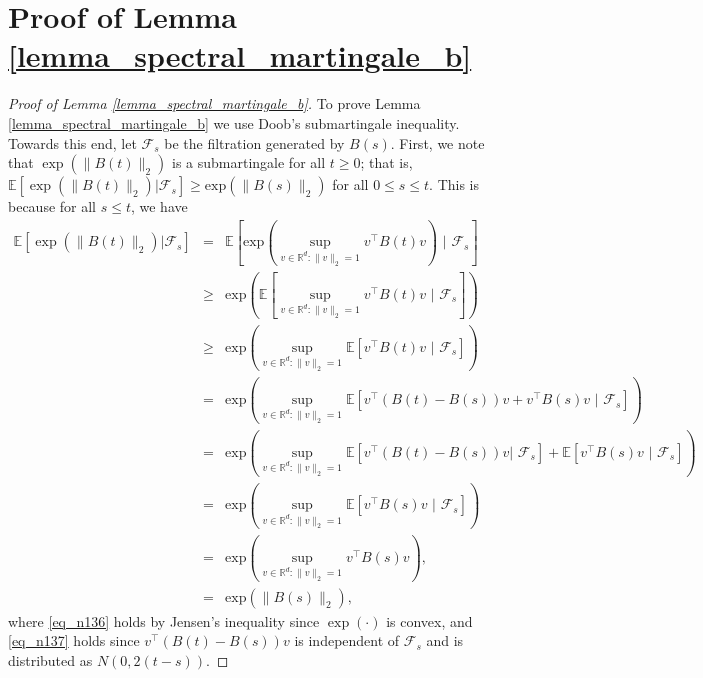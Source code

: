 \documentclass[11pt,letterpaper]{article}
\begin{document}
\section{Proof of Lemma \ref{lemma_spectral_martingale_b}}\label{sec_proof_of_lemma_spectral_martingale_b}
%
\begin{proof}[Proof of Lemma \ref{lemma_spectral_martingale_b}]
%
To prove Lemma \ref{lemma_spectral_martingale_b} we use Doob's submartingale inequality.
%
Towards this end, let  $\mathcal{F}_s$ be the filtration generated by $B(s)$.
%
First, we note that $\exp(\|B(t)\|_2)$ is a submartingale for all $t \geq 0$; that is, $\mathbb{E}[\exp(\|B(t)\|_2) |  \mathcal{F}_s] \geq  \mathrm{exp}(\| B(s)\|_2 )$ for all $0\leq s \leq t$.
%
This is because for all $s \leq t$, we have
\begin{eqnarray}
\mathbb{E}[\exp(\|B(t)\|_2) |  \mathcal{F}_s] &=& \mathbb{E}\left[\mathrm{exp}\left(\sup_{v \in \mathbb{R}^d: \|v\|_2 = 1} v^\top B(t) v\right) \, \, \bigg | \, \,\mathcal{F}_s\right] \nonumber\\
%
&\geq & \mathrm{exp}\left(\mathbb{E}\left[\sup_{v \in \mathbb{R}^d: \|v\|_2 = 1} v^\top B(t) v \, \, \bigg | \, \,\mathcal{F}_s\right]\right) \label{eq_n136}\\
%
%
&\geq &\mathrm{exp}\left(\sup_{v \in \mathbb{R}^d: \|v\|_2 = 1}  \mathbb{E}\left[v^\top B(t) v \, \,  | \, \, \mathcal{F}_s\right]\right) \nonumber \\
%
&=&  \mathrm{exp}\left(\sup_{v \in \mathbb{R}^d: \|v\|_2 = 1}  \mathbb{E}\left[v^\top (B(t) - B(s)) v  + v^\top B(s) v \, \,  | \, \, \mathcal{F}_s\right] \right)  \nonumber \\
%
&=&  \mathrm{exp}\left(\sup_{v \in \mathbb{R}^d: \|v\|_2 = 1}  \mathbb{E}\left[v^\top (B(t) - B(s)) v | \, \, \mathcal{F}_s\right]  +  \mathbb{E}\left[v^\top B(s) v \, \,  | \, \, \mathcal{F}_s\right] \right)  \label{eq_n137} \\
%
&=& \mathrm{exp}\left( \sup_{v \in \mathbb{R}^d: \|v\|_2 = 1}  \mathbb{E}\left[v^\top B(s) v \, \,  | \, \, \mathcal{F}_s\right] \right)  \nonumber \\
%
&=& \mathrm{exp}\left(\sup_{v \in \mathbb{R}^d: \|v\|_2 = 1}  v^\top B(s) v \right),  \nonumber \\
%
&=& \mathrm{exp}(\| B(s)\|_2 ),   \nonumber 
\end{eqnarray}
%
where \eqref{eq_n136} holds by Jensen's inequality since $\exp(\cdot)$ is convex, and \eqref{eq_n137} holds since $v^\top (B(t) - B(s)) v$ is independent of $\mathcal{F}_s$ and is distributed as $N(0,2(t-s))$.

\end{proof}
\end{document}
